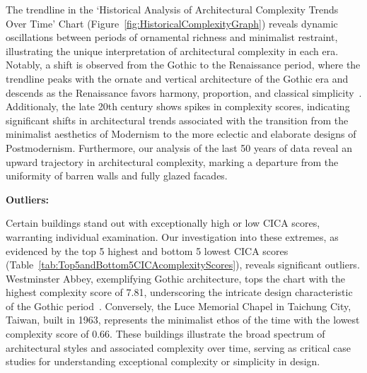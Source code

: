 The trendline in the `Historical Analysis of Architectural Complexity Trends Over Time' Chart (Figure~\ref{fig:HistoricalComplexityGraph}) reveals dynamic oscillations between periods of ornamental richness and minimalist restraint, illustrating the unique interpretation of architectural complexity in each era.
Notably, a shift is observed from the Gothic to the Renaissance period, where the trendline peaks with the ornate and vertical architecture of the Gothic era and descends as the Renaissance favors harmony, proportion, and classical simplicity~\cite{Stacbond2020}.
Additionaly, the late 20th century shows spikes in complexity scores, indicating significant shifts in architectural trends associated with the transition from the minimalist aesthetics of Modernism to the more eclectic and elaborate designs of Postmodernism.
Furthermore, our analysis of the last 50 years of data reveal an upward trajectory in architectural complexity, marking a departure from the uniformity of barren walls and fully glazed facades.

\textbf{Outliers:}

Certain buildings stand out with exceptionally high or low CICA scores, warranting individual examination.
Our investigation into these extremes, as evidenced by the top 5 highest and bottom 5 lowest CICA scores (Table~\ref{tab:Top5andBottom5CICAcomplexityScores}), reveals significant outliers.
Westminster Abbey, exemplifying Gothic architecture, tops the chart with the highest complexity score of 7.81, underscoring the intricate design characteristic of the Gothic period~\cite{Stacbond2020}.
Conversely, the Luce Memorial Chapel in Taichung City, Taiwan, built in 1963, represents the minimalist ethos of the time with the lowest complexity score of 0.66.
These buildings illustrate the broad spectrum of architectural styles and associated complexity over time, serving as critical case studies for understanding exceptional complexity or simplicity in design.




